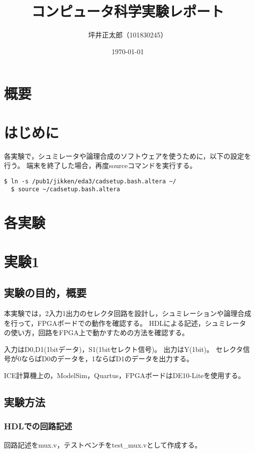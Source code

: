 \documentclass[a4paper,15pt]{jsarticle}
\begin{document}
\title{コンピュータ科学実験レポート}
\author{坪井正太郎（101830245）}
\date{\today}
\maketitle
\section*{概要}

\section*{はじめに}
各実験で，シュミレータや論理合成のソフトウェアを使うために，以下の設定を行う。
端末を終了した場合，再度sourceコマンドを実行する。
\begin{lstlisting}[caption={設定の読み込み},label={設定の読み込み}]
  $ ln -s /pub1/jikken/eda3/cadsetup.bash.altera ~/
  $ source ~/cadsetup.bash.altera
\end{lstlisting}

\section*{各実験}

\section{実験1}
\subsection{実験の目的，概要}
本実験では，2入力1出力のセレクタ回路を設計し，シュミレーションや論理合成を行って，FPGAボードでの動作を確認する。
HDLによる記述，シュミレータの使い方，回路をFPGA上で動かすための方法を確認する。

入力はD0,D1(1bitデータ)，S1(1bitセレクト信号)。
出力はY(1bit)。
セレクタ信号が0ならばD0のデータを，1ならばD1のデータを出力する。

ICE計算機上の，ModelSim，Quartus，FPGAボードはDE10-Liteを使用する。

\subsection{実験方法}
\subsubsection{HDLでの回路記述}
回路記述をmux.v，テストベンチをtest\_mux.vとして作成する。
\end{document}
